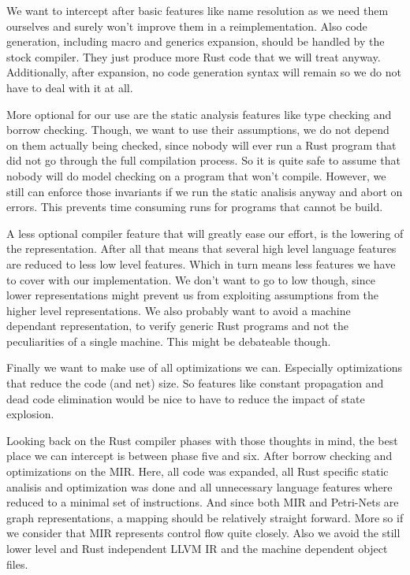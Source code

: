 We want to intercept after basic features like name resolution as we need them ourselves and surely won't improve them in a reimplementation.
Also code generation, including macro and generics expansion, should be handled by the stock compiler.
They just produce more Rust code that we will treat anyway.
Additionally, after expansion, no code generation syntax will remain so we do not have to deal with it at all.

More optional for our use are the static analysis features like type checking and borrow checking.
Though, we want to use their assumptions, we do not depend on them actually being checked, since nobody will ever run a Rust program that did not go through the full compilation process.
So it is quite safe to assume that nobody will do model checking on a program that won't compile.
However, we still can enforce those invariants if we run the static analisis anyway and abort on errors.
This prevents time consuming runs for programs that cannot be build.

A less optional compiler feature that will greatly ease our effort, is the lowering of the representation.
After all that means that several high level language features are reduced to less low level features.
Which in turn means less features we have to cover with our implementation.
We don't want to go to low though, since lower representations might prevent us from exploiting assumptions from the higher level representations.
We also probably want to avoid a machine dependant representation,
to verify generic Rust programs and not the peculiarities of a single machine.
This might be debateable though.

Finally we want to make use of all optimizations we can.
Especially optimizations that reduce the code (and net) size.
So features like constant propagation and dead code elimination would be nice to have to reduce the impact of state explosion.

Looking back on the Rust compiler phases with those thoughts in mind, the best place we can intercept is between phase five and six.
After borrow checking and optimizations on the MIR.
Here, all code was expanded, all Rust specific static analisis and optimization was done and all unnecessary language features where reduced to a minimal set of instructions.
And since both MIR and Petri-Nets are graph representations, a mapping should be relatively straight forward.
More so if we consider that MIR represents control flow quite closely.
Also we avoid the still lower level and Rust independent LLVM IR and the machine dependent object files. 

